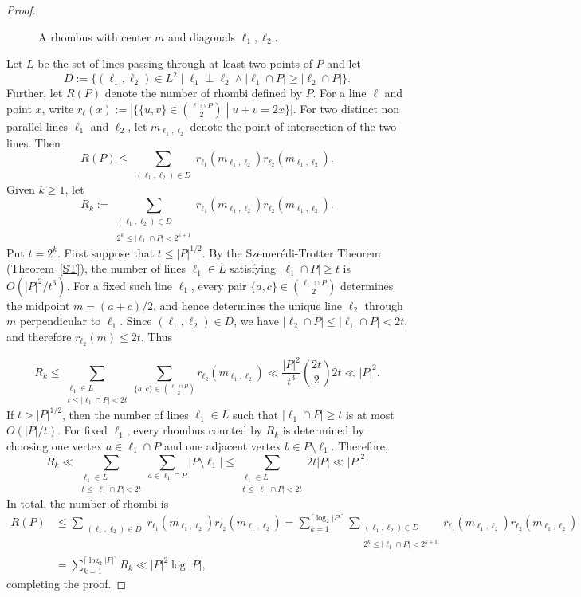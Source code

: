 \documentclass[10pt,a4paper]{amsart}
\begin{document}
\begin{proof}
\begin{figure}[h]
\begin{tikzpicture}[scale=1]
\end{tikzpicture}
\caption{A rhombus with center $m$ and diagonals $\ell_1,\ell_2$.}
\label{rhombusfigure}
\end{figure}
Let $L$ be the set of lines passing through at least two points of $P$ and let $$D:=\{(\ell_1,\ell_2)\in L^2\;|\;  \ell_1\perp \ell_2 \land |\ell_1\cap P|\geq |\ell_2\cap P|\}.$$
Further, let $R(P)$ denote the number of rhombi defined by $P$. For a line $\ell$ and point $x$, write $r_{\ell}(x):=|\{\{u,v\}\in \binom{\ell\cap P}{2}\;|\;u+v=2x\}|$. For two distinct non parallel lines $\ell_1$ and $\ell_2$, let $m_{\ell_1,\ell_2}$ denote the point of intersection of the two lines. Then
    $$R(P)\leq \sum_{\substack{(\ell_1,\ell_2)\in D }}r_{\ell_1}(m_{\ell_1,\ell_2})r_{\ell_2}(m_{\ell_1,\ell_2}).$$
Given $k\geq 1$, let $$R_k:=\sum_{\substack{(\ell_1,\ell_2)\in D\\  \\2^k\leq |\ell_1 \cap P|<2^{k+1}}}r_{\ell_1}(m_{\ell_1,\ell_2})r_{\ell_2}(m_{\ell_1,\ell_2}).$$
Put \(t=2^k\). First suppose that \(t\leq |P|^{1/2}\). By the Szemer\'{e}di-Trotter Theorem (Theorem~\ref{ST}), the number of lines \(\ell_1\in L\) satisfying
\(|\ell_1\cap P|\geq t\) is \(O(|P|^2/t^3)\). For a fixed such line
\(\ell_1\), every pair \(\{a,c\}\in \binom{\ell_1\cap P}{2}\)
determines the midpoint $m=(a+c)/2$, and hence determines the unique line \(\ell_2\) through \(m\) perpendicular
to \(\ell_1\). Since \((\ell_1,\ell_2)\in D\), we have $|\ell_2\cap P|\leq |\ell_1\cap P|<2t$, and therefore \(r_{\ell_2}(m)\leq 2t\). Thus



$$R_k\leq\sum_{\substack{\ell_1\in L\\ t\leq |\ell_1 \cap P|<2t}}\sum_{\{a,c\}\in{\binom{\ell_1\cap P}{2}}}r_{\ell_2}(m_{\ell_1,\ell_2})\ll \frac{|P|^2}{t^3} \binom{2t}{2}2t\ll |P|^2.$$
If $t> |P|^{1/2}$, then the number of lines $\ell_1\in L$ such that $|\ell_1\cap P|\geq t$ is at most $O(|P|/t)$. For fixed \(\ell_1\), every rhombus counted by \(R_k\) is determined by choosing one vertex
\(a\in \ell_1\cap P\) and one adjacent vertex
\(b\in P\setminus \ell_1\). Therefore,
$$R_k \ll\sum_{\substack{\ell_1\in L\\ t\leq |\ell_1 \cap P|<2t}}\sum_{a\in\ell_1\cap P}|P\setminus \ell_1|\leq \sum_{\substack{\ell_1\in L\\ t\leq |\ell_1 \cap P|<2t}} 2t |P|\ll |P|^2.$$
In total, the number of rhombi is 
\begin{align*}   
R(P)&\leq \sum_{\substack{(\ell_1,\ell_2)\in D }}r_{\ell_1}(m_{\ell_1,\ell_2})r_{\ell_2}(m_{\ell_1,\ell_2})
    =\sum_{k=1}^{\lceil \log_2|P| \rceil}\sum_{\substack{(\ell_1,\ell_2)\in D\\   \\2^k\leq |\ell_1 \cap P|<2^{k+1}}}r_{\ell_1}(m_{\ell_1,\ell_2})r_{\ell_2}(m_{\ell_1,\ell_2})  \\
    &=\sum_{k=1}^{\lceil \log_2|P| \rceil}R_k   
    \ll  |P|^2\log|P|,
    \end{align*}
completing the proof.
\end{proof}
\end{document}
